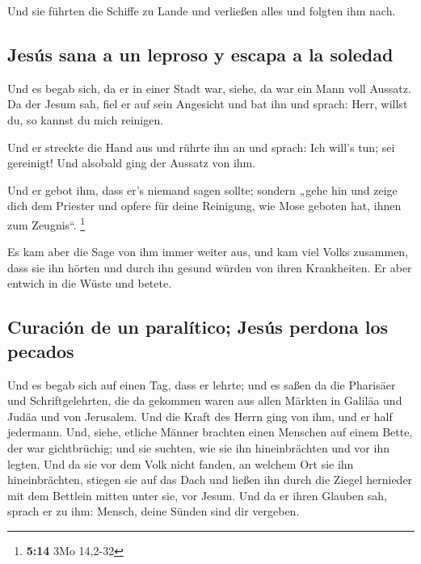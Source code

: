  Und sie führten die Schiffe zu Lande und verließen alles
und folgten ihm nach.

\hypertarget{jesuxfas-sana-a-un-leproso-y-escapa-a-la-soledad}{%
\subsection{Jesús sana a un leproso y escapa a la
soledad}\label{jesuxfas-sana-a-un-leproso-y-escapa-a-la-soledad}}

 Und es begab sich, da er in einer Stadt war, siehe, da
war ein Mann voll Aussatz. Da der Jesum sah, fiel er auf sein Angesicht
und bat ihn und sprach: Herr, willst du, so kannst du mich reinigen.

 Und er streckte die Hand aus und rührte ihn an und
sprach: Ich will's tun; sei gereinigt! Und alsobald ging der Aussatz von
ihm.

 Und er gebot ihm, dass er's niemand sagen sollte;
sondern „gehe hin und zeige dich dem Priester und opfere für deine
Reinigung, wie Mose geboten hat, ihnen zum Zeugnis``. \footnote{\textbf{5:14}
  3Mo 14,2-32}

 Es kam aber die Sage von ihm immer weiter aus, und kam
viel Volks zusammen, dass sie ihn hörten und durch ihn gesund würden von
ihren Krankheiten.  Er aber entwich in die Wüste und
betete.

\hypertarget{curaciuxf3n-de-un-paraluxedtico-jesuxfas-perdona-los-pecados}{%
\subsection{Curación de un paralítico; Jesús perdona los
pecados}\label{curaciuxf3n-de-un-paraluxedtico-jesuxfas-perdona-los-pecados}}

 Und es begab sich auf einen Tag, dass er lehrte; und es
saßen da die Pharisäer und Schriftgelehrten, die da gekommen waren aus
allen Märkten in Galiläa und Judäa und von Jerusalem. Und die Kraft des
Herrn ging von ihm, und er half jedermann.  Und, siehe,
etliche Männer brachten einen Menschen auf einem Bette, der war
gichtbrüchig; und sie suchten, wie sie ihn hineinbrächten und vor ihn
legten.  Und da sie vor dem Volk nicht fanden, an welchem
Ort sie ihn hineinbrächten, stiegen sie auf das Dach und ließen ihn
durch die Ziegel hernieder mit dem Bettlein mitten unter sie, vor Jesum.
 Und da er ihren Glauben sah, sprach er zu ihm: Mensch,
deine Sünden sind dir vergeben.

